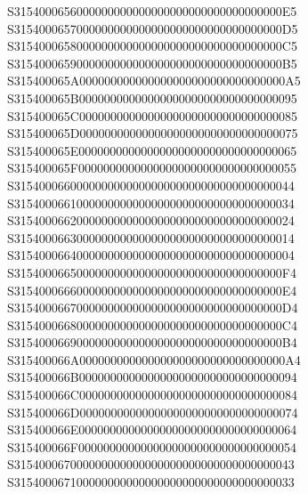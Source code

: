 \documentclass[12pt,a4paper]{article}
\begin{document}
\begin{framed}
{S3154000656000000000000000000000000000000000E5\newline
S3154000657000000000000000000000000000000000D5\newline
S3154000658000000000000000000000000000000000C5\newline
S3154000659000000000000000000000000000000000B5\newline
S315400065A000000000000000000000000000000000A5\newline
S315400065B00000000000000000000000000000000095\newline
S315400065C00000000000000000000000000000000085\newline
S315400065D00000000000000000000000000000000075\newline
S315400065E00000000000000000000000000000000065\newline
S315400065F00000000000000000000000000000000055\newline
S315400066000000000000000000000000000000000044\newline
S315400066100000000000000000000000000000000034\newline
S315400066200000000000000000000000000000000024\newline
S315400066300000000000000000000000000000000014\newline
S315400066400000000000000000000000000000000004\newline
S3154000665000000000000000000000000000000000F4\newline
S3154000666000000000000000000000000000000000E4\newline
S3154000667000000000000000000000000000000000D4\newline
S3154000668000000000000000000000000000000000C4\newline
S3154000669000000000000000000000000000000000B4\newline
S315400066A000000000000000000000000000000000A4\newline
S315400066B00000000000000000000000000000000094\newline
S315400066C00000000000000000000000000000000084\newline
S315400066D00000000000000000000000000000000074\newline
S315400066E00000000000000000000000000000000064\newline
S315400066F00000000000000000000000000000000054\newline
S315400067000000000000000000000000000000000043\newline
S315400067100000000000000000000000000000000033\newline
}
\end{framed}
\end{document}
